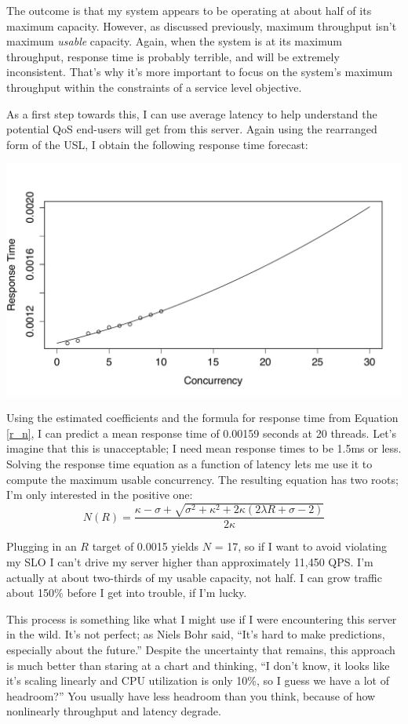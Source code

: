 \documentclass{vivid_layout}
\begin{document}
The outcome is that my system appears to be operating at about half of its
maximum capacity. However, as discussed previously, maximum throughput isn't
maximum {\itshape usable} capacity. Again, when the system is at its maximum
throughput, response time is probably terrible, and will be extremely
inconsistent. That's why it's more important to focus on the system's maximum
throughput within the constraints of a service level objective.

As a first step towards this, I can use average latency to help understand the
potential QoS end-users will get from this server. Again using the rearranged
form of the USL, I obtain the following response time forecast:
\begin{center}
\includegraphics[width=.85\linewidth]{scalability/cisco-3}
\end{center}

Using the estimated coefficients and the formula for response time from Equation
\ref{r_n}, I can predict a mean response time
of 0.00159 seconds at 20 threads. Let's imagine that this is unacceptable; I
need mean response times to be 1.5ms or less. Solving the response time equation
as a function of latency lets me use it to compute the maximum usable
concurrency. The resulting equation has two roots; I'm only interested in the
positive one:
\begin{equation}
N(R)=\frac{\kappa-\sigma+\sqrt{\sigma^2+\kappa^2+2\kappa(2\lambda R+\sigma-2)}} {2\kappa}
\label{n_r}
\end{equation}

Plugging in an $R$ target of 0.0015 yields $N$ = 17, so if I want to avoid
violating my SLO I can't drive my server higher than approximately 11,450 QPS.
I'm actually at about two-thirds of my usable capacity, not half. I can grow
traffic about 150\% before I get into trouble, if I'm lucky.

This process is something like what I might use if I were encountering this
server in the wild. It's not perfect; as Niels Bohr said, ``It's hard to make
predictions, especially about the future.'' Despite the uncertainty that
remains, this approach is much better than staring at a chart and thinking, ``I
don't know, it looks like it's scaling linearly and CPU utilization is only
10\%, so I guess we have a lot of headroom?'' You usually have less headroom
than you think, because of how nonlinearly throughput and latency degrade.
\end{document}
